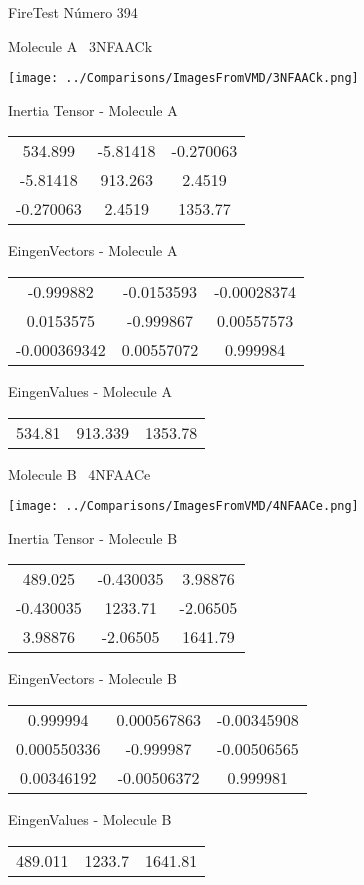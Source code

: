 \vtab[-3cm]
\begin{center}
{\large FireTest \tab Número 394}
\end{center}
\begin{multicols}{2}
\begin{center}

Molecule A \
3NFAACk

\texttt{[image: ../Comparisons/ImagesFromVMD/3NFAACk.png]}

Inertia Tensor - Molecule A \\
\begin{tabular}{|c c c|}
534.899	 & 	-5.81418	 & 	-0.270063	 \\
-5.81418	 & 	913.263	 & 	2.4519	 \\
-0.270063	 & 	2.4519	 & 	1353.77
\end{tabular}

\vtab
 EingenVectors - Molecule A     \\
\begin{tabular}{|c c c|}
-0.999882	 & 	-0.0153593	 & 	-0.00028374	 \\
0.0153575	 & 	-0.999867	 & 	0.00557573	 \\
-0.000369342	 & 	0.00557072	 & 	0.999984
\end{tabular}

\vtab
 EingenValues - Molecule A     \\
\begin{tabular}{|c c c|}
534.81	 & 	913.339	 & 	1353.78	 \\
\end{tabular}
\columnbreak

Molecule B \
4NFAACe

\texttt{[image: ../Comparisons/ImagesFromVMD/4NFAACe.png]}

Inertia Tensor - Molecule B \\
\begin{tabular}{|c c c|}
489.025	 & 	-0.430035	 & 	3.98876	 \\
-0.430035	 & 	1233.71	 & 	-2.06505	 \\
3.98876	 & 	-2.06505	 & 	1641.79
\end{tabular}

\vtab
 EingenVectors - Molecule B     \\
\begin{tabular}{|c c c|}
0.999994	 & 	0.000567863	 & 	-0.00345908	 \\
0.000550336	 & 	-0.999987	 & 	-0.00506565	 \\
0.00346192	 & 	-0.00506372	 & 	0.999981
\end{tabular}

\vtab
 EingenValues - Molecule B     \\
\begin{tabular}{|c c c|}
489.011	 & 	1233.7	 & 	1641.81	 \\
\end{tabular}

\end{center}
\end{multicols}

